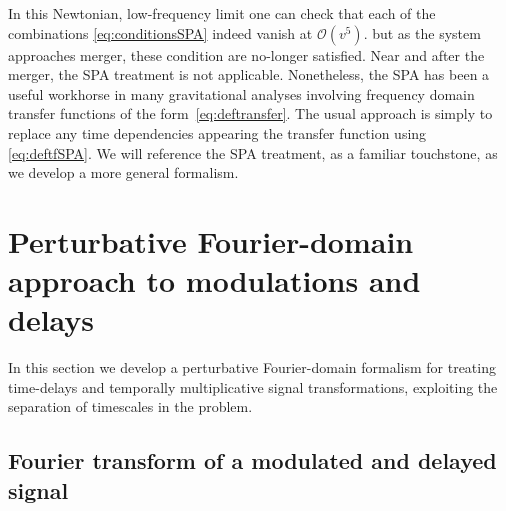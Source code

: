 \documentclass[aps,showpacs,twocolumn,
prd,superscriptaddress,nofootinbib]{revtex4-1}
\newcommand\calO{{\mathcal{O}}}
\newcommand{\jgb}[1]{{\color{DarkGreen} #1}}
\begin{document}
In this Newtonian, low-frequency limit one can check that each of the combinations \eqref{eq:conditionsSPA} indeed vanish at $\calO{(v^5)}$. but as the system approaches merger, these condition are no-longer satisfied. Near and after the merger, the SPA treatment is not applicable.
Nonetheless, the SPA has been a useful workhorse in many gravitational analyses involving frequency domain transfer functions of the form~\eqref{eq:deftransfer}. The usual approach is simply to replace any time dependencies appearing the transfer function using \eqref{eq:deftfSPA}. \jgb{We will reference the SPA treatment, as a familiar touchstone, as we develop a more general formalism.}


\section{Perturbative Fourier-domain approach to modulations and delays}
\label{sec:formalism}


In this section we develop a perturbative Fourier-domain formalism for treating time-delays and temporally multiplicative signal transformations, exploiting the separation of timescales in the problem.

\subsection{Fourier transform of a modulated and delayed signal}
\label{subsec:FTgeneral}
\end{document}
